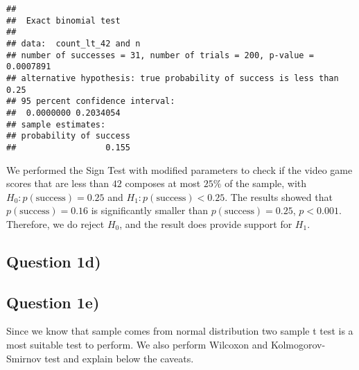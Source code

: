 \documentclass[
]{article}
\newenvironment{Shaded}{\begin{snugshade}}{\end{snugshade}}
\newcommand{\AttributeTok}[1]{\textcolor[rgb]{0.13,0.29,0.53}{#1}}
\newcommand{\ConstantTok}[1]{\textcolor[rgb]{0.56,0.35,0.01}{#1}}
\newcommand{\ControlFlowTok}[1]{\textcolor[rgb]{0.13,0.29,0.53}{\textbf{#1}}}
\newcommand{\DecValTok}[1]{\textcolor[rgb]{0.00,0.00,0.81}{#1}}
\newcommand{\FunctionTok}[1]{\textcolor[rgb]{0.13,0.29,0.53}{\textbf{#1}}}
\newcommand{\NormalTok}[1]{#1}
\newcommand{\OtherTok}[1]{\textcolor[rgb]{0.56,0.35,0.01}{#1}}
\newcommand{\SpecialCharTok}[1]{\textcolor[rgb]{0.81,0.36,0.00}{\textbf{#1}}}
\begin{document}
\begin{verbatim}
## 
##  Exact binomial test
## 
## data:  count_lt_42 and n
## number of successes = 31, number of trials = 200, p-value = 0.0007891
## alternative hypothesis: true probability of success is less than 0.25
## 95 percent confidence interval:
##  0.0000000 0.2034054
## sample estimates:
## probability of success 
##                  0.155
\end{verbatim}

We performed the Sign Test with modified parameters to check if the
video game scores that are less than \(42\) composes at most \(25\%\) of
the sample, with \(H_0 : p(\text{success}) = 0.25\) and
\(H_1 : p(\text{success}) < 0.25\). The results showed that
\(p(\text{success}) = 0.16\) is significantly smaller than
\(p(\text{success}) = 0.25\), \(p < 0.001\). Therefore, we do reject
\(H_0\), and the result does provide support for \(H_1\).

\hypertarget{question-1d}{%
\subsection{Question 1d)}\label{question-1d}}

\begin{Shaded}
\end{Shaded}

\hypertarget{question-1e}{%
\subsection{Question 1e)}\label{question-1e}}

Since we know that sample comes from normal distribution two sample t
test is a most suitable test to perform. We also perform Wilcoxon and
Kolmogorov-Smirnov test and explain below the caveats.
\end{document}
